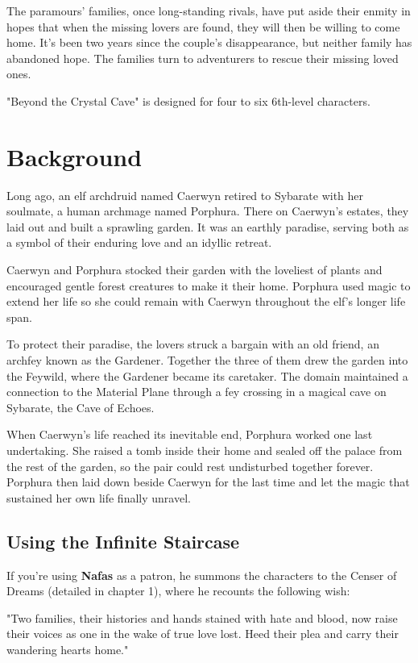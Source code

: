 \documentclass[10pt,a4paper,twoside,bg=print,twocolumn,openany,nodeprecatedcode]{dndbook}
\begin{document}
The paramours' families, once long-standing rivals, have put aside their enmity in hopes that when the missing lovers are found, they will then be willing to come home. It's been two years since the couple's disappearance, but neither family has abandoned hope. The families turn to adventurers to rescue their missing loved ones.

"Beyond the Crystal Cave" is designed for four to six 6th-level characters.

\section{Background}
Long ago, an elf archdruid named Caerwyn retired to Sybarate with her soulmate, a human archmage named Porphura. There on Caerwyn's estates, they laid out and built a sprawling garden. It was an earthly paradise, serving both as a symbol of their enduring love and an idyllic retreat.

Caerwyn and Porphura stocked their garden with the loveliest of plants and encouraged gentle forest creatures to make it their home. Porphura used magic to extend her life so she could remain with Caerwyn throughout the elf's longer life span.

To protect their paradise, the lovers struck a bargain with an old friend, an archfey known as the Gardener. Together the three of them drew the garden into the Feywild, where the Gardener became its caretaker. The domain maintained a connection to the Material Plane through a fey crossing in a magical cave on Sybarate, the Cave of Echoes.

When Caerwyn's life reached its inevitable end, Porphura worked one last undertaking. She raised a tomb inside their home and sealed off the palace from the rest of the garden, so the pair could rest undisturbed together forever. Porphura then laid down beside Caerwyn for the last time and let the magic that sustained her own life finally unravel.

\subsection{Using the Infinite Staircase}
If you're using \textbf{Nafas} as a patron, he summons the characters to the Censer of Dreams (detailed in chapter 1), where he recounts the following wish:

\begin{DndReadAloud}{}
"Two families, their histories and hands stained with hate and blood, now raise their voices as one in the wake of true love lost. Heed their plea and carry their wandering hearts home."

\end{DndReadAloud}
\end{document}
